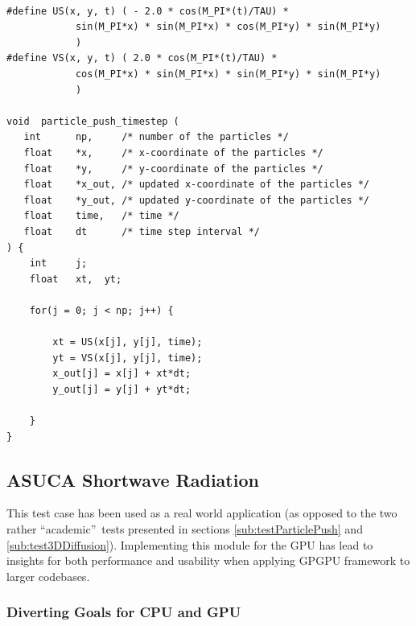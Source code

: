 \begin{lstlisting}[style=cStyle, name=ppush, label=listing:ppush, caption={Particle Push Example Program.}]

#define US(x, y, t) ( - 2.0 * cos(M_PI*(t)/TAU) * 
		    sin(M_PI*x) * sin(M_PI*x) * cos(M_PI*y) * sin(M_PI*y) 
		    )
#define VS(x, y, t) ( 2.0 * cos(M_PI*(t)/TAU) * 
		    cos(M_PI*x) * sin(M_PI*x) * sin(M_PI*y) * sin(M_PI*y) 
		    )

void  particle_push_timestep (
   int      np,     /* number of the particles */
   float    *x,     /* x-coordinate of the particles */
   float    *y,     /* y-coordinate of the particles */
   float    *x_out, /* updated x-coordinate of the particles */
   float    *y_out, /* updated y-coordinate of the particles */
   float    time,   /* time */
   float    dt      /* time step interval */
) {
	int     j;
	float   xt,  yt;
	
	for(j = 0; j < np; j++) {
	
	    xt = US(x[j], y[j], time);
	    yt = VS(x[j], y[j], time);
	    x_out[j] = x[j] + xt*dt;
	    y_out[j] = y[j] + yt*dt;
	   
	}
}
\end{lstlisting}

\subsection{ASUCA Shortwave Radiation} \label{sub:testASUCARadSW}

This test case has been used as a real world application (as opposed to the two rather \textquotedblleft academic\textquotedblright\ tests presented in sections \ref{sub:testParticlePush} and \ref{sub:test3DDiffusion}). Implementing this module for the GPU  has lead to insights for both performance and usability when applying GPGPU framework to larger codebases. 

\subsubsection{Diverting Goals for CPU and GPU} \label{sub:swDivertingGoals}

